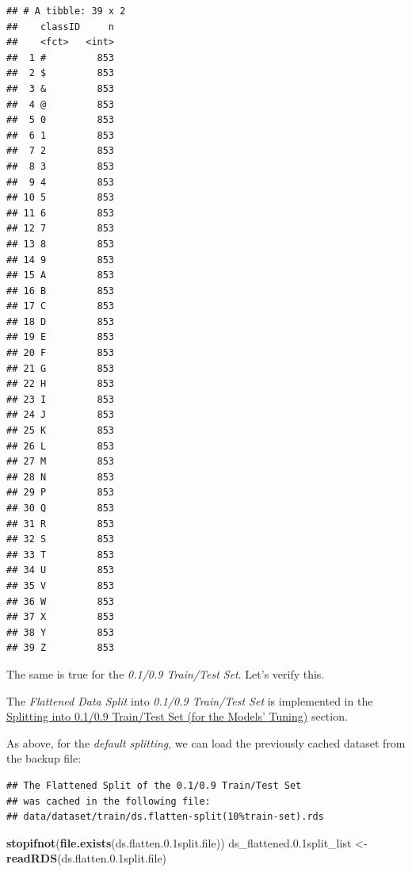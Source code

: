 \documentclass[
]{report}
\newenvironment{Shaded}{\begin{snugshade}}{\end{snugshade}}
\newcommand{\FloatTok}[1]{\textcolor[rgb]{0.00,0.00,0.81}{#1}}
\newcommand{\FunctionTok}[1]{\textcolor[rgb]{0.13,0.29,0.53}{\textbf{#1}}}
\newcommand{\NormalTok}[1]{#1}
\newcommand{\OtherTok}[1]{\textcolor[rgb]{0.56,0.35,0.01}{#1}}
\begin{document}
\begin{verbatim}
## # A tibble: 39 x 2
##    classID     n
##    <fct>   <int>
##  1 #         853
##  2 $         853
##  3 &         853
##  4 @         853
##  5 0         853
##  6 1         853
##  7 2         853
##  8 3         853
##  9 4         853
## 10 5         853
## 11 6         853
## 12 7         853
## 13 8         853
## 14 9         853
## 15 A         853
## 16 B         853
## 17 C         853
## 18 D         853
## 19 E         853
## 20 F         853
## 21 G         853
## 22 H         853
## 23 I         853
## 24 J         853
## 25 K         853
## 26 L         853
## 27 M         853
## 28 N         853
## 29 P         853
## 30 Q         853
## 31 R         853
## 32 S         853
## 33 T         853
## 34 U         853
## 35 V         853
## 36 W         853
## 37 X         853
## 38 Y         853
## 39 Z         853
\end{verbatim}

\normalsize

\newpage

The same is true for the \emph{0.1/0.9 Train/Test Set}. Let's verify this.

\protect{}\label{ds_flatten.splitting0.1_0.9}
The \emph{Flattened Data Split} into \emph{0.1/0.9 Train/Test Set} is implemented in the \href{https://github.com/AzKurban-edX-DS/edx.capstone.choose-your-own/blob/main/r/support-scripts/prepare-flattened-datasets.R\#L52-L84}{Splitting into 0.1/0.9 Train/Test Set (for the Models' Tuning)} section.

As above, for the \emph{default splitting}, we can load the previously cached dataset from the backup file:

\begin{verbatim}
## The Flattened Split of the 0.1/0.9 Train/Test Set 
## was cached in the following file:
## data/dataset/train/ds.flatten-split(10%train-set).rds
\end{verbatim}

\begin{Shaded}
\begin{Highlighting}[]
\FunctionTok{stopifnot}\NormalTok{(}\FunctionTok{file.exists}\NormalTok{(ds.flatten.}\FloatTok{0.1}\NormalTok{split.file))}
\NormalTok{ds\_flattened.}\FloatTok{0.1}\NormalTok{split\_list }\OtherTok{\textless{}{-}} \FunctionTok{readRDS}\NormalTok{(ds.flatten.}\FloatTok{0.1}\NormalTok{split.file)}
\end{Highlighting}
\end{Shaded}
\end{document}
